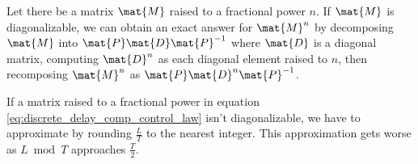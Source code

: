 Let there be a matrix $\mat{M}$ raised to a fractional power $n$. If $\mat{M}$
is diagonalizable, we can obtain an exact answer for $\mat{M}^n$ by decomposing
$\mat{M}$ into $\mat{P}\mat{D}\mat{P}^{-1}$ where $\mat{D}$ is a diagonal
matrix, computing $\mat{D}^n$ as each diagonal element raised to $n$, then
recomposing $\mat{M}^n$ as $\mat{P}\mat{D}^n\mat{P}^{-1}$.

If a matrix raised to a fractional power in equation
\eqref{eq:discrete_delay_comp_control_law} isn't diagonalizable, we have to
approximate by rounding $\frac{L}{T}$ to the nearest integer. This approximation
gets worse as $L \bmod T$ approaches $\frac{T}{2}$.
